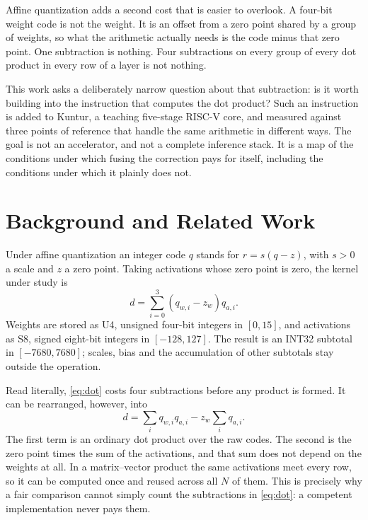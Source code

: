 Affine quantization adds a second cost that is easier to overlook. A four-bit
weight code is not the weight. It is an offset from a zero point shared by a
group of weights, so what the arithmetic actually needs is the code minus that
zero point. One subtraction is nothing. Four subtractions on every group of
every dot product in every row of a layer is not nothing.

This work asks a deliberately narrow question about that subtraction: is it
worth building into the instruction that computes the dot product? Such an
instruction is added to Kuntur, a teaching five-stage RISC-V core, and measured
against three points of reference that handle the same arithmetic in different
ways. The goal is not an accelerator, and not a complete inference stack. It is
a map of the conditions under which fusing the correction pays for itself,
including the conditions under which it plainly does not.



\section{Background and Related Work}
Under affine quantization an integer code \(q\) stands for \(r=s(q-z)\), with
\(s>0\) a scale and \(z\) a zero point. Taking activations whose zero point is
zero, the kernel under study is
\begin{equation}
d=\sum_{i=0}^{3}(q_{w,i}-z_w)q_{a,i}.
\label{eq:dot}
\end{equation}
Weights are stored as U4, unsigned four-bit integers in \([0,15]\), and
activations as S8, signed eight-bit integers in \([-128,127]\). The result is
an INT32 subtotal in \([-7680,7680]\); scales, bias and the accumulation of
other subtotals stay outside the operation.

Read literally, \eqref{eq:dot} costs four subtractions before any product is
formed. It can be rearranged, however, into
\begin{equation}
d=\sum_i q_{w,i}q_{a,i}-z_w\sum_i q_{a,i}.
\label{eq:factor}
\end{equation}
The first term is an ordinary dot product over the raw codes. The second is the
zero point times the sum of the activations, and that sum does not depend on
the weights at all. In a matrix--vector product the same activations meet every
row, so it can be computed once and reused across all \(N\) of them. This is
precisely why a fair comparison cannot simply count the subtractions in
\eqref{eq:dot}: a competent implementation never pays them.

